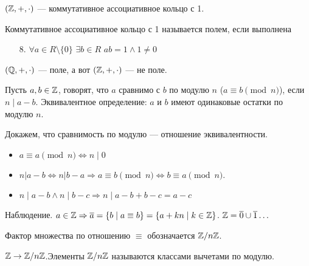 \slashn
\begin{example}
    $(\mathbb{Z}, +, \cdot)$ --- коммутативное ассоциативное кольцо с 1.
\end{example}
\begin{definition}
    Коммутативное ассоциативное кольцо с 1 называется полем, если выполнена 
    \begin{enumerate}
        \item[8.] $\forall a \in R \setminus \{0\}$  $\exists b \in R$  $ab = 1 \land 1 \neq 0$
    \end{enumerate}
\end{definition}
\begin{example}
    $(\mathbb{Q}, +, \cdot)$ --- поле, а вот  $(\mathbb{Z}, +, \cdot)$ --- не поле.
\end{example}

\begin{definition}
Пусть $a, b \in \mathbb{Z}$, говорят, что  $a$ сравнимо с  $b$ по модулю  $n$ ($a \equiv b \pmod{n}$), если $n \mid a - b$. Эквивалентное определение:  $a$ и  $b$ имеют одинаковые остатки по модулю  $n$.
\end{definition}
Докажем, что сравнимость по модулю --- отношение эквивалентности.
\begin{itemize}
    \item $a \equiv a \pmod{n} \iff n \mid 0$
    \item $n | a - b \iff n | b - a \Rightarrow a \equiv b \pmod{n} \iff b \equiv a \pmod{n}$.
    \item $n \mid a - b \land n \mid b - c \Rightarrow n \mid a - b + b - c = a - c$
\end{itemize}
\slashn
Наблюдение.  $a \in \mathbb{Z} \Rightarrow \overline{a} = \{b \mid a \equiv b\} = \{a + kn \mid k \in \mathbb{Z}\}$. $\mathbb{Z} = \overline{0} \cup \overline{1} \ldots$

\begin{definition}
    Фактор множества по отношению $\equiv$ обозначается  $\mathbb{Z} / n\mathbb{Z}$.
\end{definition}

$\mathbb{Z} \to \mathbb{Z} / n\mathbb{Z}$.Элементы $\mathbb{Z} / n\mathbb{Z}$ называются классами вычетами по модулю.


